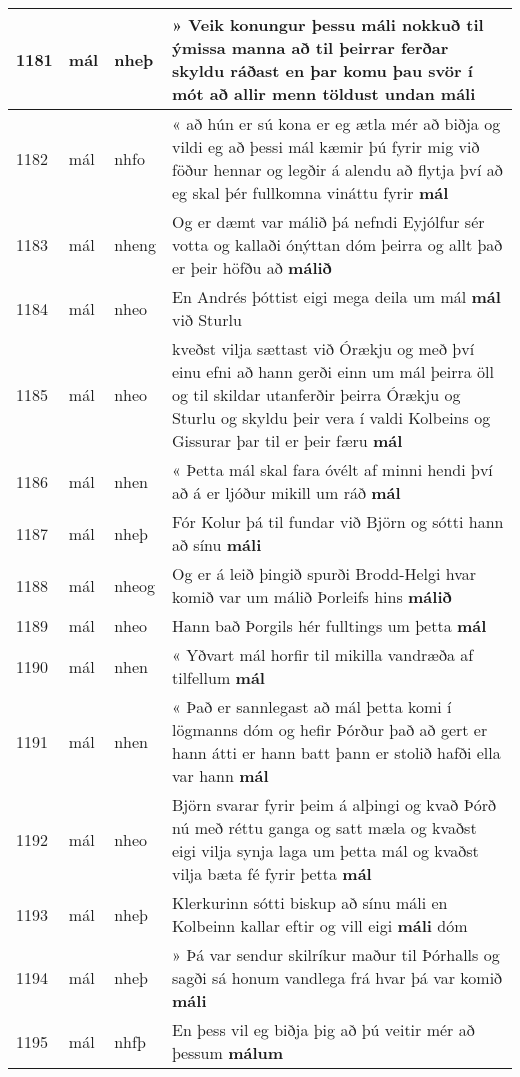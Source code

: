 \documentclass{article}
\begin{document}
\begin{longtable}{p{1cm}|p{1cm}|p{1cm}|p{13cm}}
\hline
1181&mál&nheþ&» Veik konungur þessu máli nokkuð til ýmissa manna að til þeirrar ferðar skyldu ráðast en þar komu þau svör í mót að allir menn töldust undan \textbf{máli} \\
\hline
1182&mál&nhfo&« að hún er sú kona er eg ætla mér að biðja og vildi eg að þessi mál kæmir þú fyrir mig við föður hennar og legðir á alendu að flytja því að eg skal þér fullkomna vináttu fyrir \textbf{mál} \\
\hline
1183&mál&nheng&Og er dæmt var málið þá nefndi Eyjólfur sér votta og kallaði ónýttan dóm þeirra og allt það er þeir höfðu að \textbf{málið} \\
\hline
1184&mál&nheo&En Andrés þóttist eigi mega deila um mál \textbf{mál} við Sturlu\\
\hline
1185&mál&nheo&kveðst vilja sættast við Órækju og með því einu efni að hann gerði einn um mál þeirra öll og til skildar utanferðir þeirra Órækju og Sturlu og skyldu þeir vera í valdi Kolbeins og Gissurar þar til er þeir færu \textbf{mál} \\
\hline
1186&mál&nhen&« Þetta mál skal fara óvélt af minni hendi því að á er ljóður mikill um ráð \textbf{mál} \\
\hline
1187&mál&nheþ&Fór Kolur þá til fundar við Björn og sótti hann að sínu \textbf{máli} \\
\hline
1188&mál&nheog&Og er á leið þingið spurði Brodd-Helgi hvar komið var um málið Þorleifs hins \textbf{málið} \\
\hline
1189&mál&nheo&Hann bað Þorgils hér fulltings um þetta \textbf{mál} \\
\hline
1190&mál&nhen&« Yðvart mál horfir til mikilla vandræða af tilfellum \textbf{mál} \\
\hline
1191&mál&nhen&« Það er sannlegast að mál þetta komi í lögmanns dóm og hefir Þórður það að gert er hann átti er hann batt þann er stolið hafði ella var hann \textbf{mál} \\
\hline
1192&mál&nheo&Björn svarar fyrir þeim á alþingi og kvað Þórð nú með réttu ganga og satt mæla og kvaðst eigi vilja synja laga um þetta mál og kvaðst vilja bæta fé fyrir þetta \textbf{mál} \\
\hline
1193&mál&nheþ&Klerkurinn sótti biskup að sínu máli en Kolbeinn kallar eftir og vill eigi \textbf{máli} dóm\\
\hline
1194&mál&nheþ&» Þá var sendur skilríkur maður til Þórhalls og sagði sá honum vandlega frá hvar þá var komið \textbf{máli} \\
\hline
1195&mál&nhfþ&En þess vil eg biðja þig að þú veitir mér að þessum \textbf{málum} \\

\end{longtable}
\end{document}
